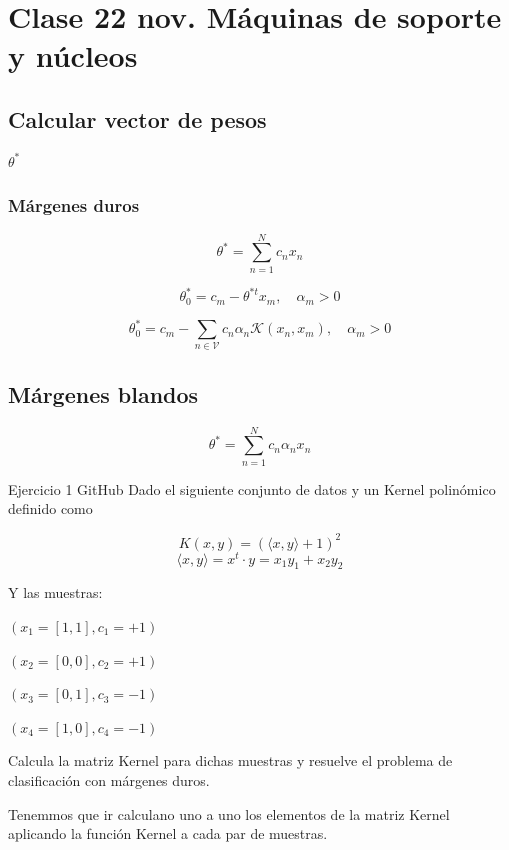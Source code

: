 \section{Clase 22 nov. Máquinas de soporte y núcleos}

\subsection{Calcular vector de pesos } $\theta^*$

\subsubsection{Márgenes duros}

$$ \theta^* = \sum_{n=1}^{N} c_n x_n $$

$$ \theta_0^* = c_m - \theta^{*t} x_m , \quad \alpha_m > 0$$

$$ \theta_0^* = c_m - \sum_{n\in \mathcal{V}} c_n \alpha_n  \mathcal{K}(x_n, x_m), \quad \alpha_m > 0$$

\subsection{Márgenes blandos}

$$ \theta^* = \sum_{n=1}^{N} c_n \alpha_n x_n $$

\begin{exercisebox}{Ejercicio 1 GitHub}
    Dado el siguiente conjunto de datos y un Kernel polinómico definido como 

$$ K(x, y) = (\langle x, y \rangle + 1)^2 $$
$$ \langle x, y \rangle = x^t \cdot y = x_1 y_1 + x_2 y_2 $$


Y las muestras:

$( x_1 = [1, 1], c_1 = +1)$

$( x_2 = [0, 0], c_2 = +1)$

$( x_3 = [0, 1], c_3 = -1)$

$( x_4 = [1, 0], c_4 = -1)$

Calcula la matriz Kernel para dichas muestras y resuelve el problema
de clasificación con márgenes duros.

\end{exercisebox}

Tenemmos que ir calculano uno a uno los elementos de la matriz Kernel
aplicando la función Kernel a cada par de muestras.

